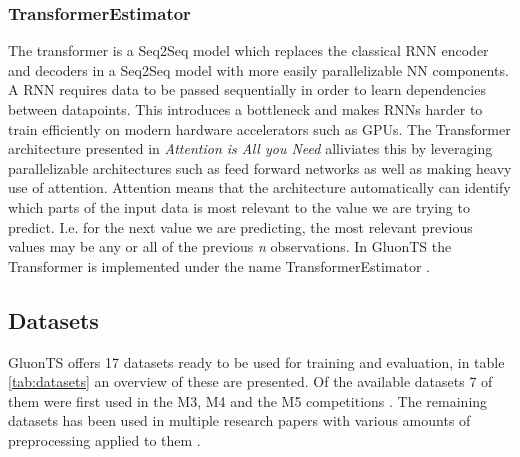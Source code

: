 \subsubsection{TransformerEstimator}
The transformer is a Seq2Seq model which replaces the classical RNN encoder and decoders in a Seq2Seq model with more easily parallelizable NN components. A RNN requires data to be passed sequentially in order to learn dependencies between datapoints. This introduces a bottleneck and makes RNNs harder to train efficiently on modern hardware accelerators such as GPUs. The Transformer architecture presented in \textit{Attention is All you Need} \cite{vaswani_attention_nodate} alliviates this by leveraging parallelizable architectures such as feed forward networks as well as making heavy use of attention. Attention means that the architecture automatically can identify which parts of the input data is most relevant to the value we are trying to predict\cite{vaswani_attention_nodate}. I.e. for the next value we are predicting, the most relevant previous values may be any or all of the previous \textit{n} observations.  In GluonTS the Transformer is implemented under the name TransformerEstimator \cite{gluonts-website}.

\subsection{Datasets}
GluonTS offers 17 datasets ready to be used for training and evaluation, in table \ref{tab:datasets} an overview of these are presented. Of the available datasets 7 of them were first used in the M3, M4 and the M5 competitions \cite{makridakis_m4_2020,m3_competition,m5}. The remaining datasets has been used in multiple research papers with various amounts of preprocessing applied to them \cite{oreshkin_n_beats_2020,lai_modeling_2018,rangapuram_deep_2018,wen_multi-horizon_2018,wang_deep_2019,seq2seq}.

